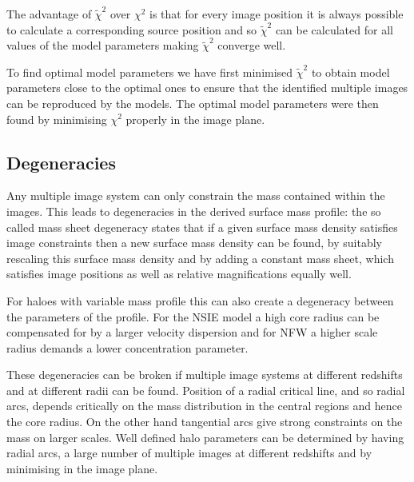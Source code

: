 \documentclass[useAMS,usenatbib]{mn2e}
\newcounter{one}   \setcounter{one}{1}
\begin{document}
The advantage of $\widetilde{\chi}^2$ over $\chi^2$ is that for every
image position it is always possible to calculate a corresponding
source position and so $\widetilde{\chi}^2$ can be calculated for all
values of the model parameters making $\widetilde{\chi}^2$ converge
well.

To find optimal model parameters we have first minimised
$\widetilde{\chi}^2$ to obtain model parameters close to the optimal
ones to ensure that the identified multiple images can be reproduced
by the models. The optimal model parameters were then found by
minimising $\chi^2$ properly in the image plane.


\subsection{Degeneracies}
\label{sec:degen}

Any multiple image system can only constrain the mass contained within
the images. This leads to degeneracies in the derived surface mass
profile: the so called mass sheet degeneracy states that if a given
surface mass density satisfies image constraints then a new surface
mass density can be found, by suitably rescaling this surface mass
density and by adding a constant mass sheet, which satisfies image
positions as well as relative magnifications equally well.

For haloes with variable mass profile this can also create a
degeneracy between the parameters of the profile. For the NSIE model a
high core radius can be compensated for by a larger velocity
dispersion and for NFW a higher scale radius demands a lower
concentration parameter.

These degeneracies can be broken if multiple image systems at
different redshifts and at different radii can be found. Position of a
radial critical line, and so radial arcs, depends critically on the
mass distribution in the central regions and hence the core radius. On
the other hand tangential arcs give strong constraints on the mass on
larger scales. Well defined halo parameters can be determined by
having radial arcs, a large number of multiple images at different
redshifts and by minimising in the image plane.

\end{document}
